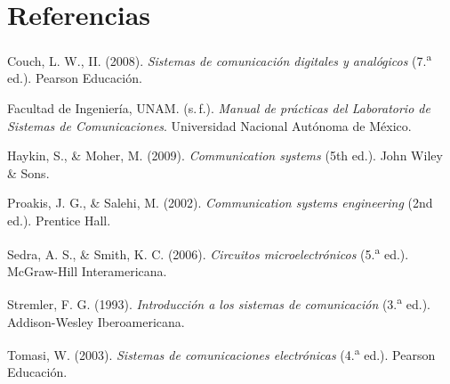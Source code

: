 \documentclass[12pt]{article}
\begin{document}
\section{Referencias}

\begin{list}{}{\setlength{\leftmargin}{1.27cm}\setlength{\itemindent}{-1.27cm}\setlength{\itemsep}{0.4em}}
    \item Couch, L. W., II. (2008). \textit{Sistemas de comunicación digitales y analógicos} (7.\textsuperscript{a} ed.). Pearson Educación.
    \item Facultad de Ingeniería, UNAM. (s.\,f.). \textit{Manual de prácticas del Laboratorio de Sistemas de Comunicaciones}. Universidad Nacional Autónoma de México.
    \item Haykin, S., \& Moher, M. (2009). \textit{Communication systems} (5th ed.). John Wiley \& Sons.
    \item Proakis, J. G., \& Salehi, M. (2002). \textit{Communication systems engineering} (2nd ed.). Prentice Hall.
    \item Sedra, A. S., \& Smith, K. C. (2006). \textit{Circuitos microelectrónicos} (5.\textsuperscript{a} ed.). McGraw-Hill Interamericana.
    \item Stremler, F. G. (1993). \textit{Introducción a los sistemas de comunicación} (3.\textsuperscript{a} ed.). Addison-Wesley Iberoamericana.
    \item Tomasi, W. (2003). \textit{Sistemas de comunicaciones electrónicas} (4.\textsuperscript{a} ed.). Pearson Educación.
\end{list}
\end{document}
